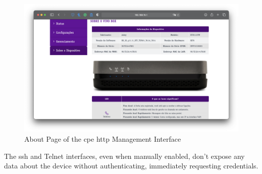 \begin{figure}[h]
    \centering
    \includegraphics[width=\linewidth]{contents/cpes-and-research-data/anonymously-accessing-management-interfaces/about-page-cpe-http-management-interface.png}
    \caption{About Page of the \gls{cpe} \gls{http} Management Interface}
    \label{figure:about_page_cpe_http_management_interface}
\end{figure}

The \gls{ssh} and Telnet interfaces, even when manually enabled, don’t expose any data about the device without authenticating, immediately requesting credentials.

\FloatBarrier
